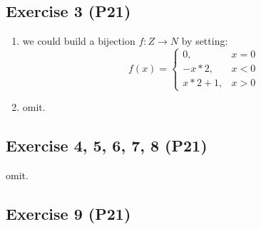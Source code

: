 \documentclass[11pt]{article}
\begin{document}
\subsection{Exercise 3 (P21)}
\label{sec:org293f115}
\begin{enumerate}
\item we could build a bijection \(f: Z\to N\) by setting:
\begin{displaymath}
  f(x) = \left\{
  \begin{array}{lr}
      0, &x = 0 \\
      -x*2, &x < 0 \\
      x*2+1, &x > 0
  \end{array}
  \right. 
\end{displaymath}
\item omit.
\end{enumerate}
\subsection{Exercise 4, 5, 6, 7, 8 (P21)}
\label{sec:org8a60275}
omit.
\subsection{Exercise 9 (P21)}
\label{sec:orgd3af2dc}
\end{document}
